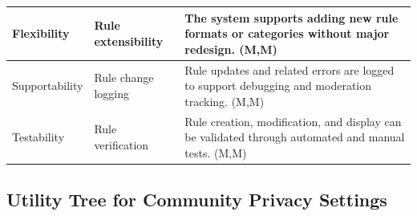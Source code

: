 \documentclass{article}
\begin{document}
\begin{table}[H]
\begin{tabular}{|p{3cm}|p{4cm}|p{7cm}|}
Flexibility
& Rule extensibility
& The system supports adding new rule formats or categories without major redesign. (M,M) \\
\hline

Supportability
& Rule change logging
& Rule updates and related errors are logged to support debugging and moderation tracking. (M,M) \\
\hline

Testability
& Rule verification
& Rule creation, modification, and display can be validated through automated and manual tests. (M,M) \\
\hline

\end{tabular}
\end{table}

\subsection{Utility Tree for Community Privacy Settings}
\end{document}
